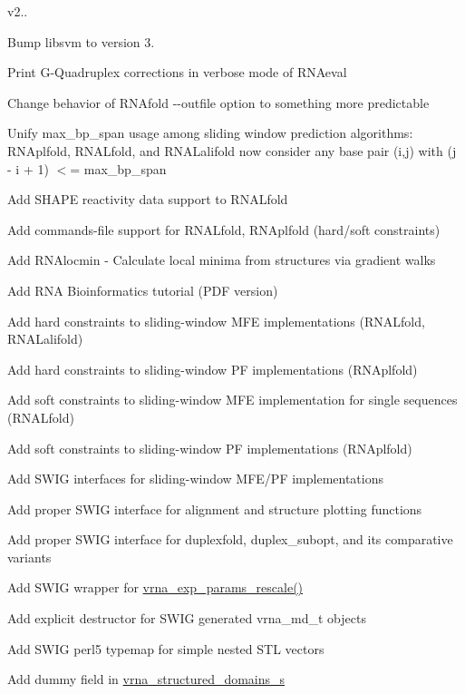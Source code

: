 v2..
\begin{DoxyItemize}
\item Bump libsvm to version 3.
\item Print G-\/\+Quadruplex corrections in verbose mode of R\+N\+Aeval
\item Change behavior of R\+N\+Afold -\/-\/outfile option to something more predictable
\item Unify max\+\_\+bp\+\_\+span usage among sliding window prediction algorithms\+: R\+N\+Aplfold, R\+N\+A\+Lfold, and R\+N\+A\+Lalifold now consider any base pair (i,j) with (j -\/ i + 1) $<$= max\+\_\+bp\+\_\+span
\item Add S\+H\+A\+PE reactivity data support to R\+N\+A\+Lfold
\item Add commands-\/file support for R\+N\+A\+Lfold, R\+N\+Aplfold (hard/soft constraints)
\item Add R\+N\+Alocmin -\/ Calculate local minima from structures via gradient walks
\item Add R\+NA Bioinformatics tutorial (P\+DF version)
\item Add hard constraints to sliding-\/window M\+FE implementations (R\+N\+A\+Lfold, R\+N\+A\+Lalifold)
\item Add hard constraints to sliding-\/window PF implementations (R\+N\+Aplfold)
\item Add soft constraints to sliding-\/window M\+FE implementation for single sequences (R\+N\+A\+Lfold)
\item Add soft constraints to sliding-\/window PF implementations (R\+N\+Aplfold)
\item Add S\+W\+IG interfaces for sliding-\/window M\+F\+E/\+PF implementations
\item Add proper S\+W\+IG interface for alignment and structure plotting functions
\item Add proper S\+W\+IG interface for duplexfold, duplex\+\_\+subopt, and its comparative variants
\item Add S\+W\+IG wrapper for \mbox{\hyperlink{group__energy__parameters_gad607bc3a5b5da16400e2ca4ea5560233}{vrna\+\_\+exp\+\_\+params\+\_\+rescale()}}
\item Add explicit destructor for S\+W\+IG generated vrna\+\_\+md\+\_\+t objects
\item Add S\+W\+IG perl5 typemap for simple nested S\+TL vectors
\item Add dummy field in \mbox{\hyperlink{structvrna__structured__domains__s}{vrna\+\_\+structured\+\_\+domains\+\_\+s}}

\end{DoxyItemize}
